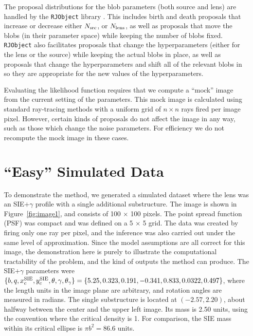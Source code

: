 \documentclass[useAMS,usenatbib]{mn2e}
\newcommand{\revisions}{\color{blue}}
\begin{document}
The proposal distributions for the blob parameters (both source and lens) are
handled by the {\tt RJObject} library \citep{rjobject}. This includes
birth and death proposals that increase or decrease either $N_{\rm src}$,
or $N_{\rm lens}$, as well as proposals that move the blobs (in their parameter
space) while keeping the number of blobs fixed. {\tt RJObject} also
facilitates proposals that change the hyperparameters (either for the lens
or the source) while keeping the actual blobs in place, as well as proposals
that change the hyperparameters and shift all of the relevant blobs in
so they are appropriate for the new values of the hyperparameters.

Evaluating the likelihood function requires that we compute a ``mock'' image from
the current setting of the parameters. This mock image is calculated using
standard ray-tracing methods with a uniform grid of $n \times n$ rays
fired per image pixel. However, certain kinds of proposals do not affect the
image in any way, such as those which change the noise parameters. For efficiency
we do not recompute the mock image in these cases.

\section{{\revisions``Easy''} Simulated Data}
To demonstrate the method, we generated a simulated dataset {\revisions where
the lens was an SIE$+\gamma$ profile with a single additional substructure}.
The image is shown in Figure~\ref{fig:image1}, and
consists of 100 $\times$ 100 pixels. The point spread function (PSF) was compact and was
defined on a 5 $\times$ 5 grid. The data was created by firing only one ray
per pixel, and the inference was also carried out under the same level of
approximation. Since the model assumptions are all correct for this image, the
demonstration here is purely to illustrate the computational tractability of
the problem, and the kind of outputs the method can produce.
{\revisions
The SIE$+\gamma$ parameters were
$\{b, q, x_c^{\rm SIE}, y_c^{\rm SIE}, \theta, \gamma, \theta_\gamma\}
= \{5.25, 0.323, 0.191, -0.341, 0.833, 0.0322, 0.497\}$, where the length
units in the image plane are arbitrary, and rotation angles are measured in
radians. The single substructure is located at $(-2.57, 2.20)$, about halfway
between the center and the upper left image.
Its mass is 2.50 units, using the convention where the
critical density is 1. For comparison, the SIE mass within its critical
ellipse is $\pi b^2 = 86.6$ units.
}
\end{document}
